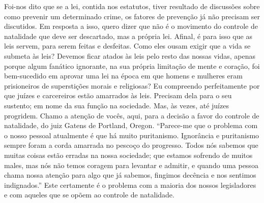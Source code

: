 Foi-nos dito que se a lei, contida nos estatutos, tiver resultado de
discussões sobre como prevenir um determinado crime, os fatores de
prevenção já não precisam ser discutidos. Em resposta a isso, quero
dizer que não é o movimento do controle de natalidade que deve ser
descartado, mas a própria lei. Afinal, é para isso que as leis servem,
para serem feitas e desfeitas. Como eles ousam exigir que a vida se
submeta às leis? Devemos ficar atados às leis pelo resto das nossas
vidas, apenas porque algum fanático ignorante, na sua própria limitação
de mente e coração, foi bem-sucedido em aprovar uma lei na época em que
homens e mulheres eram prisioneiros de superstições morais e religiosas?
Eu compreendo perfeitamente por que juízes e carcereiros estão amarrados
às leis. Precisam dela para o seu sustento; em nome da sua função na
sociedade. Mas, às vezes, até juízes progridem. Chamo a atenção de
vocês, aqui, para a decisão a favor do controle de natalidade, do juiz
Gatens de Portland, Oregon. ``Parece-me que o problema com o nosso
pessoal atualmente é que há muito puritanismo. Ignorância e puritanismo
sempre foram a corda amarrada no pescoço do progresso. Todos nós sabemos
que muitas coisas estão erradas na nossa sociedade; que estamos sofrendo
de muitos males, mas nós não temos coragem para levantar e admitir, e
quando uma pessoa chama nossa atenção para algo que já sabemos, fingimos
decência e nos sentimos indignados.'' Este certamente é o problema com a
maioria dos nossos legisladores e com aqueles que se opõem ao controle
de natalidade.

